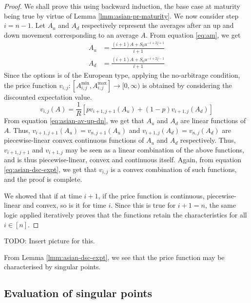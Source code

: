 \begin{proof}
	We shall prove this using backward induction, the base case at maturity being true by virtue of Lemma \ref{lmm:asian-pr-maturity}.
	We now consider step $ i = n-1 $. Let $A_u$ and $A_d$ respectively represent the averages after an up and down movement corresponding to an average $A$. From equation \ref{eq:am}, we get
	\begin{subequations}
		\label{eq:asian-av-up-dn}
		\begin{align}
			A_u &= \frac{ (i+1) A + S_0 u^{-i+2j+1} }{ i+1 } \\
			A_d &= \frac{ (i+1) A + S_0 u^{-i+2j-1} }{ i+1 }
		\end{align}
	\end{subequations}
	Since the options is of the European type, applying the no-arbitrage condition, the price function $ v_{i,j}: \left[ A_{i,j}^{\min}, A_{i,j}^{\max} \right] \to [0, \infty) $ is obtained by considering the discounted expectation value.
	\begin{equation}
		\label{eq:asian-dsc-expt}
		v_{i,j}(A) = \frac{1}{R} \left[ p v_{i+1,j+1}(A_u) + (1 - p) v_{i+1,j}(A_d) \right]
	\end{equation}
	From equation \ref{eq:asian-av-up-dn}, we get that $A_u$ and $A_d$ are linear functions of $A$. Thus, $ v_{i+1,j+1}(A_u) = v_{n,j+1}(A_u)$ and $ v_{i+1,j}(A_d) = v_{n,j}(A_d) $ are piecewise-linear convex continuous functions of $A_u$ and $A_d$ respectively. Thus, $ v_{i+1,j+1} $ and $ v_{i+1,j} $ may be seen as a linear combination of the above functions, and is thus piecewise-linear, convex and continuous itself. Again, from equation \ref{eq:asian-dsc-expt}, we get that $v_{i,j}$ is a convex combination of such functions, and the proof is complete.
	
	We showed that if at time $ i+1 $, if the price function is continuous, piecewise-linear and convex, so is it for time $ i $. Since this is true for $ i+1 = n $, the same logic applied iteratively proves that the functions retain the characteristics for all $ i \in [n] $.
\end{proof}
TODO: Insert picture for this.


\begin{rem}
	From Lemma \ref{lmm:asian-dsc-expt}, we see that the price function may be characterised by singular points.
\end{rem}



\subsection{Evaluation of singular points}
\label{subsec:asian-eu-eval}

